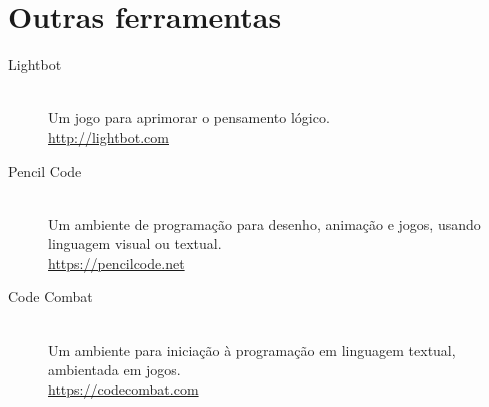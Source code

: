 \documentclass[11pt,fleqn]{book} %
\begin{document}
\section{Outras ferramentas}

\begin{description}

	\item[Lightbot] ~\\
	Um jogo para aprimorar o pensamento lógico.\\
	\url{http://lightbot.com} 
	
	
	\item[Pencil Code] ~\\
	Um ambiente de programação para desenho, animação e jogos, usando linguagem visual ou textual.\\
	\url{https://pencilcode.net}
	

	
	\item[Code Combat] ~\\
	Um ambiente para iniciação à programação em linguagem textual, ambientada em jogos.\\
	\url{https://codecombat.com} 
	

\end{description}
\end{document}

